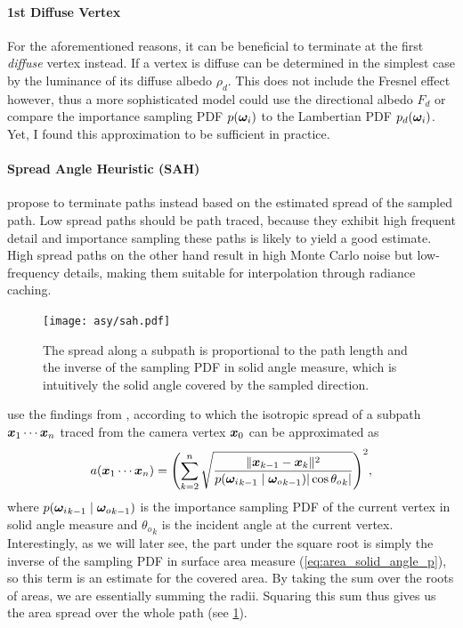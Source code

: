 \paragraph{1st Diffuse Vertex}
\label{par:pt_1st_diffuse}
For the aforementioned reasons, it can be beneficial to terminate at the first \emph{diffuse} vertex instead.
If a vertex is diffuse can be determined in the simplest case by the luminance of its diffuse albedo $\rho_d$.
This does not include the Fresnel effect however, thus a more sophisticated model could use the directional albedo $F_d$ or compare the importance sampling PDF $p({\bm{\omega}_i})$ to the Lambertian PDF $p_d({\bm{\omega}_i})$.
Yet, I found this approximation to be sufficient in practice.

\paragraph{Spread Angle Heuristic (SAH)}
\label{par:pt_sah}
\textcite{muller2021} propose to terminate paths instead based on the estimated spread of the sampled path.
Low spread paths should be path traced, because they exhibit high frequent detail and importance sampling these paths is likely to yield a good estimate.
High spread paths on the other hand result in high Monte Carlo noise but low-frequency details, making them suitable for interpolation through radiance caching.

\begin{figure}[htb!]
    \centering
    \texttt{[image: asy/sah.pdf]}
    \caption{The spread along a subpath is proportional to the path length and the inverse of the sampling PDF in solid angle measure, which is intuitively the solid angle covered by the sampled direction.}
    \label{fig:sah}
\end{figure}

\textcite{muller2021} use the findings from \textcite{bekaert2003}, according to which the isotropic spread of a subpath $\bm{x}_1 \cdots \bm{x}_n$ traced from the camera vertex $\bm{x}_0$ can be approximated as
\begin{equation}
    a(\x_1 \cdots \x_n) = \left(\sum_{k=2}^{n} \sqrt{\frac{\|\x_{k-1} - \x_k\|^2}{p(\wi_{k-1} \mid \wo_{k-1}) |\cos {\theta_o}_k|}}\right)^2,
\end{equation}
where $p({\bm{\omega}_i}_{k-1} \mid {\bm{\omega}_o}_{k-1})$ is the importance sampling PDF of the current vertex in solid angle measure and ${\theta_o}_k$ is the incident angle at the current vertex.
Interestingly, as we will later see, the part under the square root is simply the inverse of the sampling PDF in surface area measure (\cref{eq:area_solid_angle_p}), so this term is an estimate for the covered area.
By taking the sum over the roots of areas, we are essentially summing the radii.
Squaring this sum thus gives us the area spread over the whole path (see \cref{fig:sah}).

